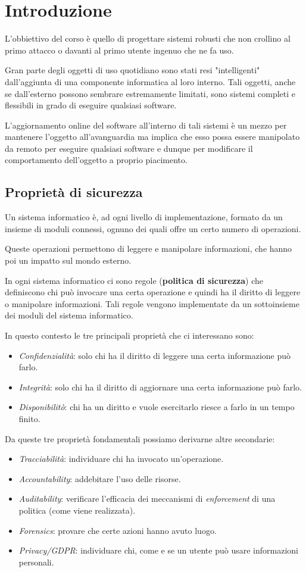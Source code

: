 \chapter{Introduzione}
L'obbiettivo del corso è quello di progettare sistemi robusti che non crollino al primo attacco o davanti al
primo utente ingenuo che ne fa uso.

Gran parte degli oggetti di uso quotidiano sono stati resi "intelligenti" dall'aggiunta di una componente
informatica al loro interno. Tali oggetti, anche se dall'esterno possono sembrare estremamente limitati, sono
sistemi completi e flessibili in grado di eseguire qualsiasi software.

L'aggiornamento online del software all'interno di tali sistemi è un mezzo per mantenere l'oggetto all'avanguardia
ma implica che esso possa essere manipolato da remoto per eseguire qualsiasi software e dunque per modificare
il comportamento dell'oggetto a proprio piacimento.

\section{Proprietà di sicurezza}
Un sistema informatico è, ad ogni livello di implementazione, formato da un insieme di moduli connessi, ognuno dei
quali offre un certo numero di operazioni.

Queste operazioni permettono di leggere e manipolare informazioni, che hanno poi un impatto sul mondo esterno.

In ogni sistema informatico ci sono regole (\textbf{politica di sicurezza}) che definiscono chi può invocare una
certa operazione e quindi ha il diritto di leggere o manipolare informazioni. Tali regole vengono implementate da
un sottoinsieme dei moduli del sistema informatico.

In questo contesto le tre principali proprietà che ci interessano sono:
\begin{itemize}
	\item \emph{Confidenzialità}: solo chi ha il diritto di leggere una certa informazione può farlo.
	\item \emph{Integrità}: solo chi ha il diritto di aggiornare una certa informazione può farlo.
	\item \emph{Disponibilitò}: chi ha un diritto e vuole esercitarlo riesce a farlo in un tempo finito.
\end{itemize}
Da queste tre proprietà fondamentali possiamo derivarne altre secondarie:
\begin{itemize}
	\item \emph{Tracciabilità}: individuare chi ha invocato un'operazione.
	\item \emph{Accountability}: addebitare l'uso delle risorse.
	\item \emph{Auditability}: verificare l'efficacia dei meccanismi di \emph{enforcement} di una politica (come
	      viene realizzata).
	\item \emph{Forensics}: provare che certe azioni hanno avuto luogo.
	\item \emph{Privacy/GDPR}: individuare chi, come e se un utente può usare informazioni personali.
\end{itemize}

